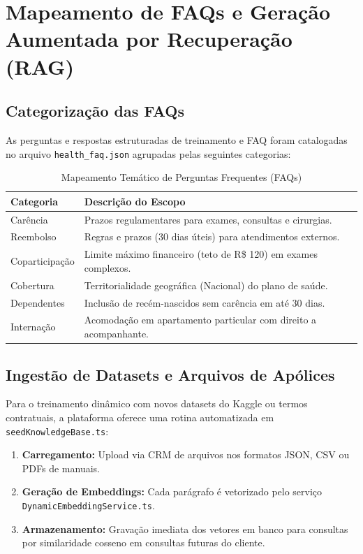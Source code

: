 \documentclass[12pt,a4paper]{article}
\begin{document}
\newpage

\section{Mapeamento de FAQs e Geração Aumentada por Recuperação (RAG)}

\subsection{Categorização das FAQs}
As perguntas e respostas estruturadas de treinamento e FAQ foram catalogadas no arquivo \texttt{health\_faq.json} agrupadas pelas seguintes categorias:
\begin{table}[h]
\centering
\caption{Mapeamento Temático de Perguntas Frequentes (FAQs)}
\begin{tabular}{lp{9cm}}
\toprule
\textbf{Categoria} & \textbf{Descrição do Escopo} \\
\midrule
Carência & Prazos regulamentares para exames, consultas e cirurgias. \\
Reembolso & Regras e prazos (30 dias úteis) para atendimentos externos. \\
Coparticipação & Limite máximo financeiro (teto de R\$ 120) em exames complexos. \\
Cobertura & Territorialidade geográfica (Nacional) do plano de saúde. \\
Dependentes & Inclusão de recém-nascidos sem carência em até 30 dias. \\
Internação & Acomodação em apartamento particular com direito a acompanhante. \\
\bottomrule
\end{tabular}
\end{table}

\subsection{Ingestão de Datasets e Arquivos de Apólices}
Para o treinamento dinâmico com novos datasets do Kaggle ou termos contratuais, a plataforma oferece uma rotina automatizada em \texttt{seedKnowledgeBase.ts}:
\begin{enumerate}
    \item \textbf{Carregamento:} Upload via CRM de arquivos nos formatos JSON, CSV ou PDFs de manuais.
    \item \textbf{Geração de Embeddings:} Cada parágrafo é vetorizado pelo serviço \texttt{DynamicEmbeddingService.ts}.
    \item \textbf{Armazenamento:} Gravação imediata dos vetores em banco para consultas por similaridade cosseno em consultas futuras do cliente.
\end{enumerate}
\end{document}
